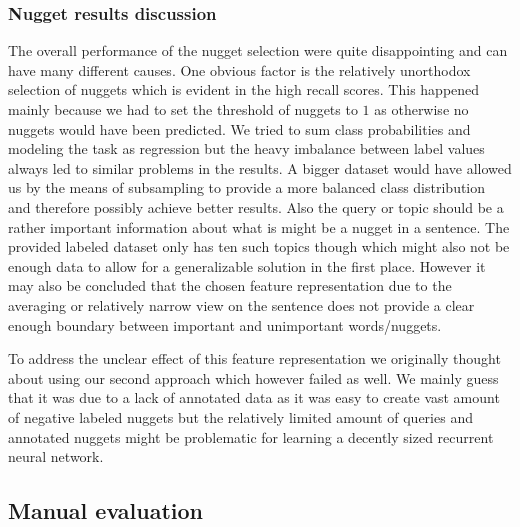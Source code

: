 \documentclass{article}
\begin{document}
\subsubsection{Nugget results discussion}
The overall performance of the nugget selection were quite disappointing and can have many different causes. One obvious factor is the relatively unorthodox selection of nuggets which is evident in the high recall scores. This happened mainly because we had to set the threshold of nuggets to $1$ as otherwise no nuggets would have been predicted. We tried to sum class probabilities and modeling the task as regression but the heavy imbalance between label values always led to similar problems in the results. A bigger dataset would have allowed us by the means of subsampling to provide a more balanced class distribution and therefore possibly achieve better results. Also the query or topic should be a rather important information about what is might be a nugget in a sentence. The provided labeled dataset only has ten such topics though which might also not be enough data to allow for a generalizable solution in the first place.  However it may also be concluded that the chosen feature representation due to the averaging or relatively narrow view on the sentence does not provide a clear enough boundary between important and unimportant words/nuggets.

To address the unclear effect of this feature representation we originally thought about using our second approach which however failed as well. We mainly guess that it was due to a lack of annotated data as  it was easy to create vast amount of negative labeled nuggets but the relatively limited amount of queries and annotated nuggets might be problematic for learning a decently sized recurrent neural network.
\subsection{Manual evaluation}



\small



\end{document}
